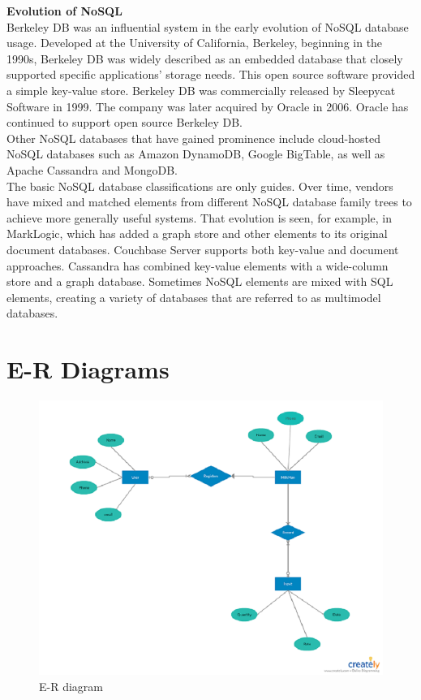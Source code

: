 \textbf{Evolution of NoSQL}\\
Berkeley DB was an influential system in the early evolution of NoSQL database usage. Developed at the University of California, Berkeley, beginning in the 1990s, Berkeley DB was widely described as an embedded database that closely supported specific applications' storage needs. This open source software provided a simple key-value store. Berkeley DB was commercially released by Sleepycat Software in 1999. The company was later acquired by Oracle in 2006. Oracle has continued to support open source Berkeley DB.\\
Other NoSQL databases that have gained prominence include cloud-hosted NoSQL databases such as Amazon DynamoDB, Google BigTable, as well as Apache Cassandra and MongoDB.\\
The basic NoSQL database classifications are only guides. Over time, vendors have mixed and matched elements from different NoSQL database family trees to achieve more generally useful systems. That evolution is seen, for example, in MarkLogic, which has added a graph store and other elements to its original document databases.  Couchbase Server supports both key-value and document approaches.  Cassandra has combined key-value elements with a wide-column store and a graph database. Sometimes NoSQL elements are mixed with SQL elements, creating a variety of databases that are referred to as multimodel databases. 

\section{E-R Diagrams}
\begin{figure}[h]
	\centering
	\includegraphics[width=0.75\linewidth]{erdiagram}
	\caption{E-R diagram}
	\label{fig:erdiagram}
\end{figure}

